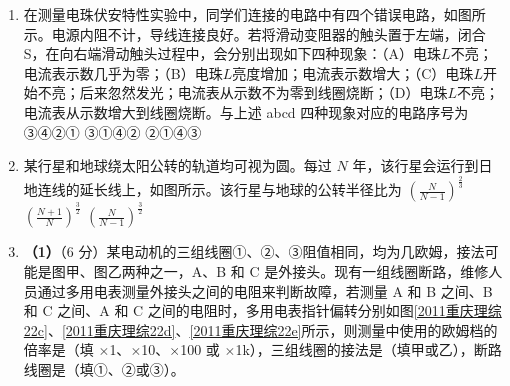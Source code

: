 \documentclass[\gkver]{gaokaozhenti}
\begin{document}
\begin{enumerate}
\item
在测量电珠伏安特性实验中，同学们连接的电路中有四个错误电路，如图所示。电源内阻不计，导线连接良好。若将滑动变阻器的触头置于左端，闭合 S，在向右端滑动触头过程中，会分别出现如下四种现象：（A）电珠$L$不亮；电流表示数几乎为零；（B）电珠$L$亮度增加；电流表示数增大；（C）电珠$L$开始不亮；后来忽然发光；电流表从示数不为零到线圈烧断；（D）电珠$L$不亮；电流表从示数增大到线圈烧断。与上述 abcd 四种现象对应的电路序号为
{③④②①}
{③①④②}
{②①④③}

\item
某行星和地球绕太阳公转的轨道均可视为圆。每过 $N$ 年，该行星会运行到日地连线的延长线上，如图所示。该行星与地球的公转半径比为
{$\left(\frac{N}{N-1}\right)^{\frac{2}{3}}$}
{$\left(\frac{N+1}{N}\right)^{\frac{3}{2}}$}
{$\left(\frac{N}{N-1}\right)^{\frac{3}{2}}$}

\item
\textbf{（1）}（6 分）某电动机的三组线圈①、②、③阻值相同，均为几欧姆，接法可能是图甲、图乙两种之一，A、B 和 C 是外接头。现有一组线圈断路，维修人员通过多用电表测量外接头之间的电阻来判断故障，若测量 A 和 B 之间、B 和 C 之间、A 和 C 之间的电阻时，多用电表指针偏转分别如图\ref{2011重庆理综22c}、\ref{2011重庆理综22d}、\ref{2011重庆理综22e}所示，则测量中使用的欧姆档的倍率是（填 $\times$1、$\times$10、$\times$100 或 $\times$1k），三组线圈的接法是（填甲或乙），断路线圈是（填①、②或③）。


\end{enumerate}
\end{document}
